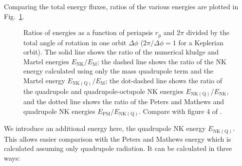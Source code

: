 \documentclass[useAMS,usedcolumn,usegraphicx,usenatbib]{mn2e}
\newcommand{\figref}[1]{Fig.~\ref{fig:#1}}
\newcommand{\sub}[1]{\ensuremath{_\mathrm{#1}}}
\begin{document}
Comparing the total energy fluxes, ratios of the various energies are plotted in \figref{Energy_ratio}.
\begin{figure}
  \begin{center}
    \quad
    \caption{Ratios of energies as a function of periapsis $r\sub{p}$ and $2\pi$ divided by the total angle of rotation in one orbit $\Delta\phi$ ($2\pi/\Delta\phi = 1$ for a Keplerian orbit). The solid line shows the ratio of the numerical kludge and Martel energies $E\sub{NK}/E\sub{M}$; the dashed line shows the ratio of the NK energy calculated using only the mass quadrupole term and the Martel energy $E\sub{NK(Q)}/E\sub{M}$; the dot-dashed line shows the ratio of the quadrupole and quadrupole-octupole NK energies $E\sub{NK(Q)}/E\sub{NK}$, and the dotted line shows the ratio of the Peters and Mathews and quadrupole NK energies $E\sub{PM}/E\sub{NK(Q)}$. Compare with figure 4 of \citet{Gair2005}.}
    \label{fig:Energy_ratio}
  \end{center}
\end{figure}
We introduce an additional energy here, the quadrupole NK energy $E\sub{NK(Q)}$. This allows easier comparison with the Peters and Mathews energy which is calculated assuming only quadrupole radiation. It can be calculated in three ways:
\end{document}
